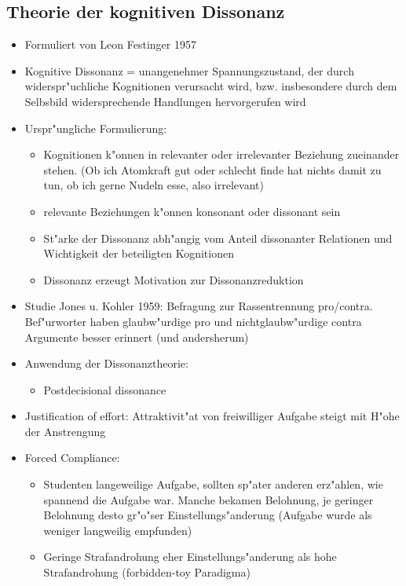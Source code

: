 \subsection{Theorie der kognitiven Dissonanz}
\begin{itemize}
	\item
		Formuliert von Leon Festinger 1957
	\item
		Kognitive Dissonanz = unangenehmer Spannungszustand, der durch widerspr"uchliche Kognitionen verursacht wird, bzw. insbesondere durch dem Selbsbild widersprechende Handlungen hervorgerufen wird
	\item
		Urspr"ungliche Formulierung:
		\begin{itemize}
			\item
				Kognitionen k"onnen in relevanter oder irrelevanter Beziehung zueinander stehen. (Ob ich Atomkraft gut oder schlecht finde hat nichts damit zu tun, ob ich gerne Nudeln esse, also irrelevant)
			\item
				relevante Beziehungen k"onnen konsonant oder dissonant sein
			\item
				St"arke der Dissonanz abh"angig vom Anteil dissonanter Relationen und Wichtigkeit der beteiligten Kognitionen
			\item
				Dissonanz erzeugt Motivation zur Dissonanzreduktion
		\end{itemize}
	\item
		Studie Jones u. Kohler 1959: Befragung zur Rassentrennung pro/contra. Bef"urworter haben glaubw"urdige pro und nichtglaubw"urdige contra Argumente besser erinnert (und andersherum)
	\item
		Anwendung der Dissonanztheorie:
		\begin{itemize}
			\item
				Postdecisional dissonance \end{itemize}
			\item
				Justification of effort: Attraktivit"at von freiwilliger Aufgabe steigt mit H"ohe der Anstrengung
			\item
				Forced Compliance:
				\begin{itemize}
					\item
						Studenten langeweilige Aufgabe, sollten sp"ater anderen erz"ahlen, wie spannend die Aufgabe war. Manche bekamen Belohnung, je geringer Belohnung desto gr"o"ser Einstellungs"anderung (Aufgabe wurde als weniger langweilig empfunden)
					\item
						Geringe Strafandrohung eher Einstellungs"anderung als hohe Strafandrohung (forbidden-toy Paradigma)

\end{itemize}
\end{itemize}
